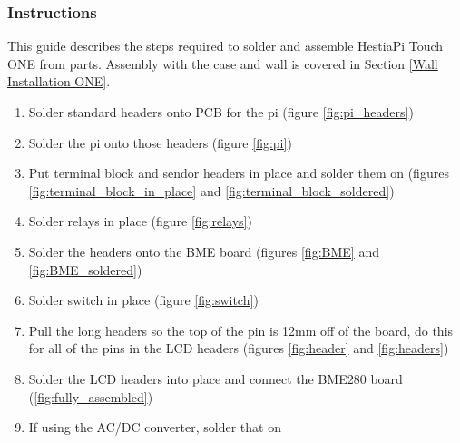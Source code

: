 \subsubsection{Instructions}
This guide describes the steps required to solder and assemble HestiaPi Touch ONE
from parts.  Assembly with the case and wall is covered in Section
\ref{Wall Installation ONE}.

\begin{enumerate}
  \item Solder standard headers onto PCB for the pi (figure \ref{fig:pi_headers})
  \item Solder the pi onto those headers (figure \ref{fig:pi})
  \item Put terminal block and sendor headers in place and solder them on (figures
	  \ref{fig:terminal_block_in_place} and \ref{fig:terminal_block_soldered})
  \item Solder relays in place (figure \ref{fig:relays})
  \item Solder the headers onto the BME board (figures \ref{fig:BME} and
	  \ref{fig:BME_soldered})
  \item Solder switch in place (figure \ref{fig:switch})
  \item Pull the long headers so the top of the pin is 12mm off of the board,
	  do this for all of the pins in the LCD headers
	  (figures \ref{fig:header} and \ref{fig:headers})
  \item Solder the LCD headers into place and connect the BME280 board
	  (\ref{fig:fully_assembled})
  \item If using the AC/DC converter, solder that on
\end{enumerate}


